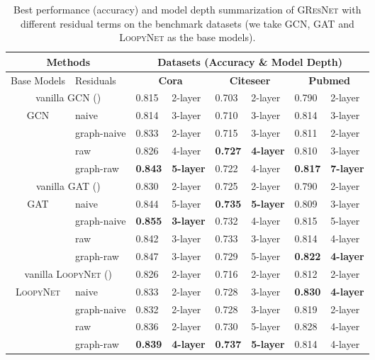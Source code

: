 \documentclass{article}
\newcommand{\gresnet}{\textsc{GResNet}}
\newcommand{\gcn}{\textsc{GCN}}
\newcommand{\gat}{\textsc{GAT}}
\newcommand{\loopy}{\textsc{LoopyNet}}
\begin{document}
\begin{table}[t]
 \vspace{-35pt}
\caption{Best performance (accuracy) and model depth summarization of {\gresnet} with different residual terms on the benchmark datasets (we take {\gcn}, {\gat} and {\loopy} as the base models). }\label{tab:performance_summary}
 \vspace{-5pt}
 \small
\centering
\setlength{\tabcolsep}{3.5pt}
\begin{tabular}{|c|l|p{0.9cm}|p{1.2cm}|p{0.9cm}|p{1.2cm}|p{0.9cm}|p{1.2cm}| }
\hline
\multicolumn{2}{|c}{Methods } & \multicolumn{6}{|c|}{Datasets (Accuracy \& Model Depth)} \\
\hline
Base Models & Residuals & \multicolumn{2}{|c}{\textbf{Cora}} & \multicolumn{2}{|c}{\textbf{Citeseer}} & \multicolumn{2}{|c|}{\textbf{Pubmed}} \\
\hline 
\hline 
\multicolumn{2}{|c|}{vanilla {\gcn} (\cite{KW16})} &0.815 &2-layer  &0.703 &2-layer &0.790 &2-layer \\
\hline 
\multirow{4}{*}{{\gcn}}
&naive&0.814 &3-layer  &0.710 &3-layer &0.814 &3-layer \\
\cline{2-8}
&graph-naive&0.833 &2-layer  &0.715 &3-layer &0.811 &2-layer \\
\cline{2-8}
&raw&0.826 &4-layer  &\textbf{0.727} &\textbf{4-layer} &0.810 &3-layer \\
\cline{2-8}
&graph-raw&\textbf{0.843} &\textbf{5-layer}  &0.722 &4-layer &\textbf{0.817} &\textbf{7-layer} \\
\hline
\hline
\multicolumn{2}{|c|}{vanilla {\gat} (\cite{PGAAPY18})} &0.830 &2-layer  &0.725 &2-layer &0.790 &2-layer \\
\hline
\multirow{4}{*}{{\gat}}
&naive& 0.844 &5-layer  &\textbf{0.735} &\textbf{5-layer} &0.809 &3-layer \\
\cline{2-8}
&graph-naive&\textbf{0.855} &\textbf{3-layer}  &0.732 &4-layer &0.815 &5-layer \\
\cline{2-8}
&raw&0.842  &3-layer  &0.733 &3-layer &0.814 &4-layer \\
\cline{2-8}
&graph-raw&{0.847} &{3-layer}  &0.729 &5-layer &\textbf{0.822} &\textbf{4-layer} \\
\hline
\hline
\multicolumn{2}{|c|}{vanilla {\loopy} (\cite{loopynet})} &0.826 &2-layer  &0.716 &2-layer &0.812 &2-layer \\
\hline
\multirow{4}{*}{{\loopy}}
&naive&0.833 &2-layer  &0.728 &3-layer &\textbf{0.830} &\textbf{4-layer} \\
\cline{2-8}
&graph-naive&0.832 &2-layer  &0.728 &3-layer &0.819 &2-layer \\
\cline{2-8}
&raw& 0.836 &2-layer  &0.730 &5-layer &0.828 &4-layer \\
\cline{2-8}
&graph-raw&\textbf{0.839} &\textbf{4-layer}  &\textbf{0.737} &\textbf{5-layer} &0.814 &4-layer \\
\hline
\end{tabular}
\vspace{-8pt}
\end{table}
\end{document}
